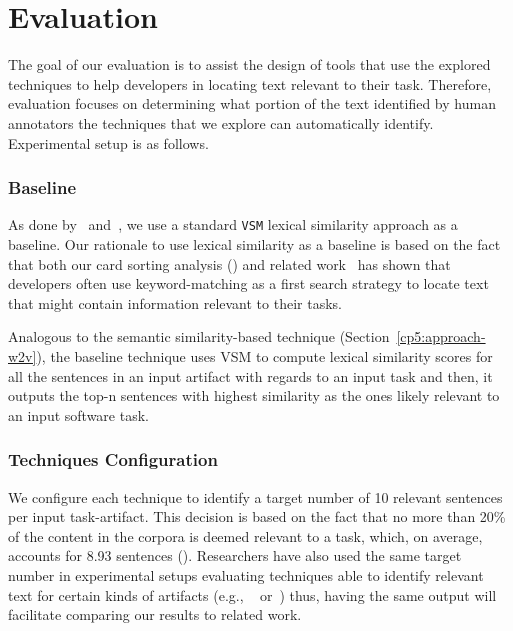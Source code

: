\clearpage

\section{Evaluation}
\label{cp5:evaluation}



The goal of our evaluation is to assist the design of tools that use the explored techniques to help developers in locating text relevant to their task.
Therefore, evaluation focuses 
on determining what portion of the text identified by human annotators the techniques that we explore can automatically identify.
Experimental setup is as follows.



\subsubsection{Baseline}


As done by~\cite{Lin2021} and~\cite{Ye2016}, we use a standard \texttt{VSM} lexical similarity approach as a baseline. Our rationale to use 
lexical similarity as a baseline is based on the fact that 
both our card sorting analysis () and related work~\cite{Ko2006a, Freund2015} has shown that developers often use keyword-matching as a first search strategy to locate text that might contain information relevant to their tasks.


Analogous to the semantic similarity-based technique (Section~\ref{cp5:approach-w2v}), the baseline technique uses VSM to compute lexical similarity scores 
for all the sentences in an input artifact with regards to an input task and then, it outputs the top-n sentences with highest similarity as the ones likely relevant to an input software task.




\subsubsection{Techniques Configuration}



We configure each technique to identify a target number of 10 relevant sentences per input task-artifact.
This decision is based on the fact that 
no more than 20\% of the content in the corpora is deemed relevant to a task, which, on average, accounts for 8.93 sentences ().
Researchers have also used the same target number in experimental setups evaluating techniques able to identify relevant text for certain kinds of artifacts (e.g., ~\cite{Xu2017} or~\cite{Lotufo2012})
thus, having the same output will facilitate comparing our results to related work.



